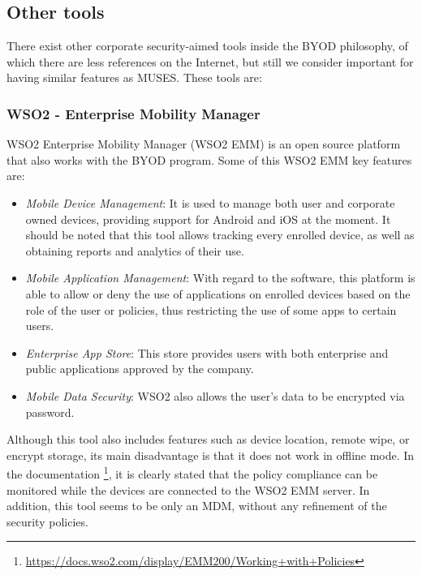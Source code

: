 
\subsection{Other tools}
\label{subsec:othertools}

There exist other corporate security-aimed tools inside the BYOD philosophy, of which there are less references on the Internet, but still we consider important for having similar features as MUSES. These tools are:

\subsubsection{WSO2 - Enterprise Mobility Manager}

WSO2 Enterprise Mobility Manager (WSO2 EMM) \cite{WSO2_tool} is an open source platform that also works with the BYOD program. Some of this WSO2 EMM key features are:
\begin{itemize}
  \item \textit{Mobile Device Management}: It is used to manage both user and corporate owned devices, providing support for Android and iOS at the moment. It should be noted that this tool allows tracking every enrolled device, as well as obtaining reports and analytics of their use.
  \item \textit{Mobile Application Management}: With regard to the software, this platform is able to allow or deny the use of applications on enrolled devices based on the role of the user or policies, thus restricting the use of some apps to certain users.
  \item \textit{Enterprise App Store}: This store provides users with both enterprise and public applications approved by the company.
  \item \textit{Mobile Data Security}: WSO2 also allows the user's data to be encrypted via password.
\end{itemize}

Although this tool also includes features such as device location, remote wipe, or encrypt storage, its main disadvantage is that it does not work in offline mode. In the documentation \footnote{\url{https://docs.wso2.com/display/EMM200/Working+with+Policies}}, it is clearly stated that the policy compliance can be monitored while the devices are connected to the WSO2 EMM server. In addition, this tool seems to be only an MDM, without any refinement of the security policies.

